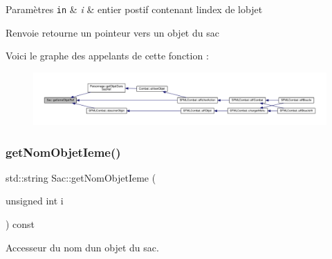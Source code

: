 \begin{DoxyParams}[1]{Paramètres}
\mbox{\tt in}  & {\em i} & entier postif contenant l\textquotesingle{}index de l\textquotesingle{}objet \\
\hline
\end{DoxyParams}
\begin{DoxyReturn}{Renvoie}
retourne un pointeur vers un objet du sac 
\end{DoxyReturn}
Voici le graphe des appelants de cette fonction \+:\nopagebreak
\begin{figure}[H]
\begin{center}
\leavevmode
\includegraphics[width=350pt]{class_sac_a41f03b324ccd719767a473fca7d2e8ec_icgraph}
\end{center}
\end{figure}
\mbox{\label{class_sac_ad8d86e7c53ae92e33c8eb89ca5033b55}} 
\subsubsection{\texorpdfstring{get\+Nom\+Objet\+Ieme()}{getNomObjetIeme()}}
{\footnotesize\ttfamily std\+::string Sac\+::get\+Nom\+Objet\+Ieme (\begin{DoxyParamCaption}\item[{unsigned int}]{i }\end{DoxyParamCaption}) const}



Accesseur du nom d\textquotesingle{}un objet du sac. 



